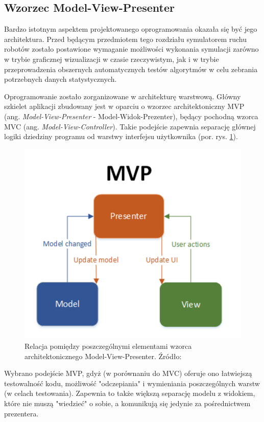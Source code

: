 \subsection{Wzorzec Model-View-Presenter}
\label{ch:app-mvp}
Bardzo istotnym aspektem projektowanego oprogramowania okazała się być jego architektura. Przed będącym przedmiotem tego rozdziału symulatorem ruchu robotów zostało postawione wymaganie możliwości wykonania symulacji zarówno w trybie graficznej wizualizacji w czasie rzeczywistym, jak i w trybie przeprowadzenia obszernych automatycznych testów algorytmów w celu zebrania potrzebnych danych statystycznych.

Oprogramowanie zostało zorganizowane w architekturę warstwową.
Główny szkielet aplikacji zbudowany jest w oparciu o wzorzec architektoniczny MVP (ang. {\it Model-View-Presenter} - Model-Widok-Prezenter), będący pochodną wzorca MVC (ang. {\it Model-View-Controller}).
Takie podejście zapewnia separację głównej logiki dziedziny programu od warstwy interfejsu użytkownika \cite{mvp} (por. rys. \ref{fig:app-mvp}).

\begin{figure}
	\centering
	\includegraphics[width=0.6\columnwidth]{img/app/mvp}
	\caption{Relacja pomiędzy poszczególnymi elementami wzorca architektonicznego Model-View-Presenter. Źródło: \cite{mvp}}
	\label{fig:app-mvp}
\end{figure}

Wybrano podejście MVP, gdyż (w porównaniu do MVC) oferuje ono łatwiejszą testowalność kodu, możliwość "odczepiania" i wymieniania poszczególnych warstw (w celach testowania). Zapewnia to także większą separację modelu z widokiem, które nie muszą "wiedzieć" o sobie, a komunikują się jedynie za pośrednictwem prezentera.

